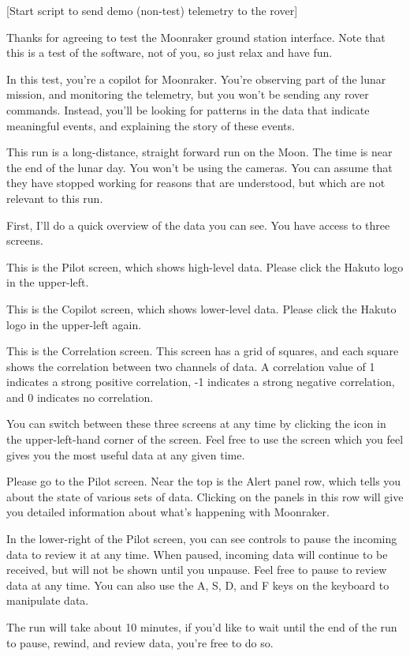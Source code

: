 [Start script to send demo (non-test) telemetry to the rover]

Thanks for agreeing to test the Moonraker ground station interface. Note that this is a test of the software, not of you, so just relax and have fun.

In this test, you're a copilot for Moonraker. You're observing part of the lunar mission, and monitoring the telemetry, but you won't be sending any rover commands. Instead, you'll be looking for patterns in the data that indicate meaningful events, and explaining the story of these events.

This run is a long-distance, straight forward run on the Moon. The time is near the end of the lunar day. You won't be using the cameras. You can assume that they have stopped working for reasons that are understood, but which are not relevant to this run.

First, I'll do a quick overview of the data you can see. You have access to three screens.

This is the Pilot screen, which shows high-level data. Please click the Hakuto logo in the upper-left.

This is the Copilot screen, which shows lower-level data. Please click the Hakuto logo in the upper-left again.

This is the Correlation screen. This screen has a grid of squares, and each square shows the correlation between two channels of data. A correlation value of 1 indicates a strong positive correlation, -1 indicates a strong negative correlation, and 0 indicates no correlation.

You can switch between these three screens at any time by clicking the icon in the upper-left-hand corner of the screen. Feel free to use the screen which you feel gives you the most useful data at any given time.

Please go to the Pilot screen. Near the top is the Alert panel row, which tells you about the state of various sets of data. Clicking on the panels in this row will give you detailed information about what's happening with Moonraker.

In the lower-right of the Pilot screen, you can see controls to pause the incoming data to review it at any time. When paused, incoming data will continue to be received, but will not be shown until you unpause. Feel free to pause to review data at any time. You can also use the A, S, D, and F keys on the keyboard to manipulate data.

The run will take about 10 minutes, if you'd like to wait until the end of the run to pause, rewind, and review data, you're free to do so.

